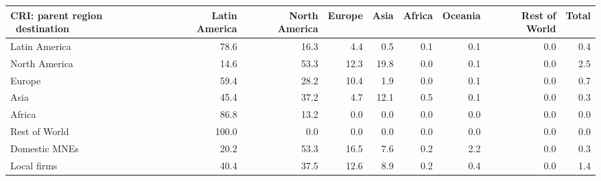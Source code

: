 \begin{tabular}{lrrrrrrrr}
\toprule
CRI: parent region \ destination & Latin America & North America & Europe & Asia & Africa & Oceania & Rest of World & Total \\
\midrule
Latin America & 78.6 & 16.3 & 4.4 & 0.5 & 0.1 & 0.1 & 0.0 & 0.4 \\
North America & 14.6 & 53.3 & 12.3 & 19.8 & 0.0 & 0.1 & 0.0 & 2.5 \\
Europe & 59.4 & 28.2 & 10.4 & 1.9 & 0.0 & 0.1 & 0.0 & 0.7 \\
Asia & 45.4 & 37.2 & 4.7 & 12.1 & 0.5 & 0.1 & 0.0 & 0.3 \\
Africa & 86.8 & 13.2 & 0.0 & 0.0 & 0.0 & 0.0 & 0.0 & 0.0 \\
Rest of World & 100.0 & 0.0 & 0.0 & 0.0 & 0.0 & 0.0 & 0.0 & 0.0 \\
Domestic MNEs & 20.2 & 53.3 & 16.5 & 7.6 & 0.2 & 2.2 & 0.0 & 0.3 \\
Local firms & 40.4 & 37.5 & 12.6 & 8.9 & 0.2 & 0.4 & 0.0 & 1.4 \\
\bottomrule
\end{tabular}
